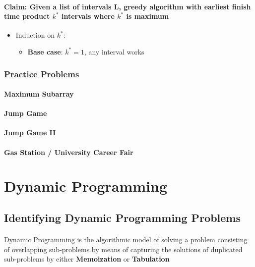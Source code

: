 \documentclass{article}
\begin{document}
\paragraph{Claim: Given a list of intervals L, greedy algorithm with earliest finish time product \(k^*\) intervals where \(k^*\) is maximum}

\begin{itemize}
	\item Induction on \(k^*\):
		\begin{itemize}
			\item \textbf{Base case}: \(k^*=1\), any interval works
		\end{itemize}
\end{itemize}

\subsubsection{Practice Problems}

\paragraph{Maximum Subarray}
\paragraph{Jump Game}
\paragraph{Jump Game II}
\paragraph{Gas Station / University Career Fair}

\section{Dynamic Programming}

\subsection{Identifying Dynamic Programming Problems}

\paragraph{}

Dynamic Programming is the algorithmic model of solving a problem consisting of overlapping sub-problems by means of capturing the solutions of duplicated sub-problems by either \textbf{Memoization} or \textbf{Tabulation}
\end{document}
